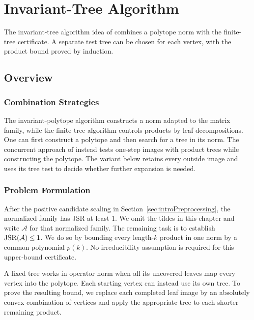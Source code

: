 \chapter{Invariant-Tree Algorithm}
\label{ch:hybridApproach}

The invariant-tree algorithm idea of \citet{MejstrikReif2025HybridApproachJSR} combines a polytope norm with the finite-tree certificate.
A separate test tree can be chosen for each vertex, with the product bound proved by induction.

\section{Overview}
\subsection{Combination Strategies}
\label{sec:hybridStrategies}

The invariant-polytope algorithm constructs a norm adapted to the matrix family, while the finite-tree algorithm controls products by leaf decompositions.
One can first construct a polytope and then search for a tree in its norm.
The concurrent approach of \citet{MejstrikReif2025HybridApproachJSR} instead tests one-step images with product trees while constructing the polytope.
The variant below retains every outside image and uses its tree test to decide whether further expansion is needed.

\subsection{Problem Formulation}
\label{sec:hybridProblemFormulation}

After the positive candidate scaling in Section~\ref{sec:introPreprocessing}, the normalized family has JSR at least $1$.
We omit the tildes in this chapter and write $\mathcal{A}$ for that normalized family.
The remaining task is to establish $\operatorname{JSR}(\mathcal{A})\leq1$.
We do so by bounding every length-$k$ product in one norm by a common polynomial $p(k)$.
No irreducibility assumption is required for this upper-bound certificate.

A fixed tree works in operator norm when all its uncovered leaves map every vertex into the polytope.
Each starting vertex can instead use its own tree.
To prove the resulting bound, we replace each completed leaf image by an absolutely convex combination of vertices and apply the appropriate tree to each shorter remaining product.

